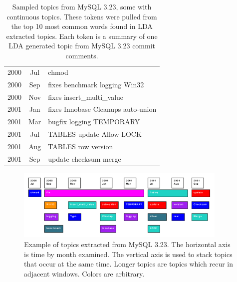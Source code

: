 \documentclass[times, 10pt,twocolumn]{article}
\begin{document}
\begin{table}
\centering
\begin{tabular}{|cc|l|}
\hline
2000 &  Jul &      chmod \\
2000 &  Sep &      fixes benchmark logging Win32 \\
2000 &  Nov &      fixes insert\_multi\_value \\
2001 &  Jan &      fixes Innobase Cleanups auto-union \\
2001 &  Mar &      bugfix logging  TEMPORARY  \\
\hline         
2001 &  Jul &      TABLES update Allow LOCK \\ 
               
2001 &  Aug &      TABLES row version \\
\hline         
2001 &  Sep &      update checksum merge \\
\hline
\end{tabular}
\caption{
Sampled topics from MySQL 3.23, some with continuous topics. These tokens were pulled from the top 10 most common words found in LDA extracted topics. Each token is a summary of one LDA generated topic from MySQL 3.23 commit comments.
}
\label{tab:portability}
\end{table}



\begin{figure}[t]
  \centering
  \includegraphics[width=0.9\textwidth]{lda}
  \caption{Example of topics extracted from MySQL 3.23. 
    The horizontal axis is time by month examined. The
    vertical axis is used to stack topics that occur at the same
    time. Longer topics are topics which recur in adjacent
    windows. Colors are arbitrary.}
  \label{fig:lda}
\end{figure}
\end{document}
